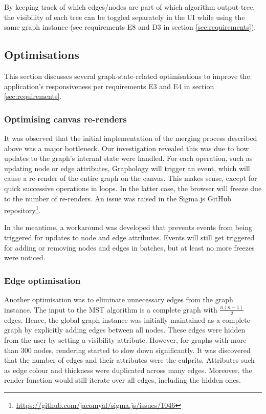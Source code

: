 \documentclass{l4proj}
\begin{document}
By keeping track of which edges/nodes are part of which algorithm output tree, the visibility of each tree can be toggled separately in the UI while using the same graph instance (see requirements E8 and D3 in section \ref{sec:requirements}).

\subsection{Optimisations}
This section discusses several graph-state-related optimisations to improve the application's responsiveness per requirements E3 and E4 in section \ref{sec:requirements}.

\subsubsection{Optimising canvas re-renders}
It was observed that the initial implementation of the merging process described above was a major bottleneck. Our investigation revealed this was due to how updates to the graph's internal state were handled.
For each operation, such as updating node or edge attributes, Graphology will trigger an event, which will cause a re-render of the entire graph on the canvas. This makes sense, except for quick successive operations in loops. In the latter case, the browser will freeze due to the number of re-renders. An issue was raised in the Sigma.js GitHub repository\footnote{\url{https://github.com/jacomyal/sigma.js/issues/1046}}.

In the meantime, a workaround was developed that prevents events from being triggered for updates to node and edge attributes. Events will still get triggered for adding or removing nodes and edges in batches, but at least no more freezes were noticed.

\subsubsection{Edge optimisation}
Another optimisation was to eliminate unnecessary edges from the graph instance. The input to the MST algorithm is a complete graph with $\frac{n(n-1)}{2}$ edges.
Hence, the global graph instance was initially maintained as a complete graph by explicitly adding edges between all nodes. These edges were hidden from the user by setting a visibility attribute.
However, for graphs with more than 300 nodes, rendering started to slow down significantly. It was discovered that the number of edges and their attributes were the culprits. Attributes such as edge colour and thickness were duplicated across many edges. Moreover, the render function would still iterate over all edges, including the hidden ones.
\end{document}
